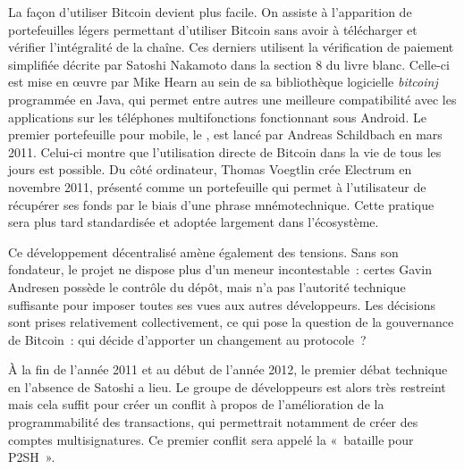 La façon d'utiliser Bitcoin devient plus facile. On assiste à l'apparition de portefeuilles légers permettant d'utiliser Bitcoin sans avoir à télécharger et vérifier l'intégralité de la chaîne. Ces derniers utilisent la vérification de paiement simplifiée décrite par Satoshi Nakamoto dans la section 8 du livre blanc. Celle-ci est mise en œuvre par Mike Hearn au sein de sa bibliothèque logicielle \emph{bitcoinj} programmée en Java, qui permet entre autres une meilleure compatibilité avec les applications sur les téléphones multifonctions fonctionnant sous Android. Le premier portefeuille pour mobile, le , est lancé par Andreas Schildbach en mars 2011. Celui-ci montre que l'utilisation directe de Bitcoin dans la vie de tous les jours est possible. Du côté ordinateur, Thomas Voegtlin crée Electrum en novembre 2011, présenté comme un portefeuille qui permet à l'utilisateur de récupérer ses fonds par le biais d'une phrase mnémotechnique. Cette pratique sera plus tard standardisée et adoptée largement dans l'écosystème.


Ce développement décentralisé amène également des tensions. Sans son fondateur, le projet ne dispose plus d'un meneur incontestable~: certes Gavin Andresen possède le contrôle du dépôt, mais n'a pas l'autorité technique suffisante pour imposer toutes ses vues aux autres développeurs. Les décisions sont prises relativement collectivement, ce qui pose la question de la gouvernance de Bitcoin~: qui décide d'apporter un changement au protocole~?

À la fin de l'année 2011 et au début de l'année 2012, le premier débat technique en l'absence de Satoshi a lieu. Le groupe de développeurs est alors très restreint mais cela suffit pour créer un conflit à propos de l'amélioration de la programmabilité des transactions, qui permettrait notamment de créer des comptes multisignatures. Ce premier conflit sera appelé la «~bataille pour P2SH~».

